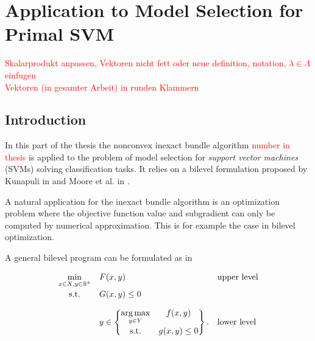 \section{Application to Model Selection for Primal SVM}

\textcolor{red}{Skalarprodukt anpassen, Vektoren nicht fett oder neue definition, notation, \(\lambda \in \Lambda\) einfugen\\
Vektoren (in gesamter Arbeit) in runden Klammern}

\subsection{Introduction}

In this part of the thesis the nonconvex inexact bundle algorithm \textcolor{red}{number in thesis} is applied to the problem of model selection for \emph{support vector machines} (SVMs) solving classification tasks.
It relies on a bilevel formulation proposed by Kunapuli in \cite{Kunapuli2008} and Moore et al. in \cite{Moore2011}.

A natural application for the inexact bundle algorithm is an optimization problem where the objective function value and subgradient can only be computed by numerical approximation. This is for example the case in bilevel optimization.

A general bilevel program can be formulated as in \cite[p. 20]{Kunapuli2008}

\begin{equation}
	\begin{array}{cll}
	\displaystyle\min_{x \in X, y \in \R^k} & F(x,y) & \text{upper level} \vspace{0.5ex}\\
	\text{s.t.} & G(x,y) \leq 0 & \vspace{1em}\\
	& y \in \begin{Bmatrix} \displaystyle\argmax_{y\in Y} & f(x,y) \vspace{0.5ex}\\
	                        \text{s.t.} & g(x,y) \leq 0 
													\end{Bmatrix}. & \text{lower level}
	\end{array}
	\label{bilevel}
\end{equation}


